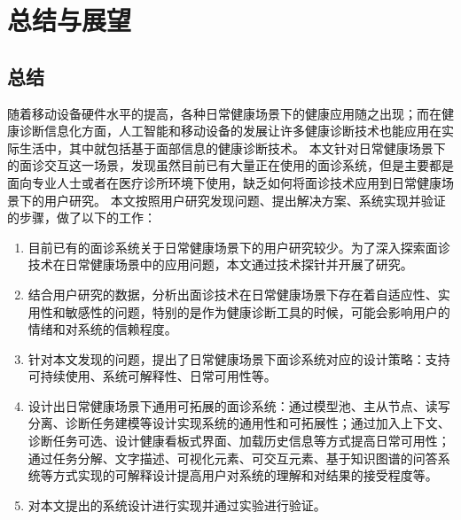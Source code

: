 \chapter{总结与展望}
\section{总结}
随着移动设备硬件水平的提高，各种日常健康场景下的健康应用随之出现；而在健康诊断信息化方面，人工智能和移动设备的发展让许多健康诊断技术也能应用在实际生活中，其中就包括基于面部信息的健康诊断技术。
本文针对日常健康场景下的面诊交互这一场景，发现虽然目前已有大量正在使用的面诊系统，但是主要都是面向专业人士或者在医疗诊所环境下使用，缺乏如何将面诊技术应用到日常健康场景下的用户研究。
本文按照用户研究发现问题、提出解决方案、系统实现并验证的步骤，做了以下的工作：
\begin{enumerate}
	\item 目前已有的面诊系统关于日常健康场景下的用户研究较少。为了深入探索面诊技术在日常健康场景中的应用问题，本文通过技术探针并开展了研究。
	
	\item 结合用户研究的数据，分析出面诊技术在日常健康场景下存在着自适应性、实用性和敏感性的问题，特别的是作为健康诊断工具的时候，可能会影响用户的情绪和对系统的信赖程度。
	
	\item 针对本文发现的问题，提出了日常健康场景下面诊系统对应的设计策略：支持可持续使用、系统可解释性、日常可用性等。

	\item 设计出日常健康场景下通用可拓展的面诊系统：通过模型池、主从节点、读写分离、诊断任务建模等设计实现系统的通用性和可拓展性；通过加入上下文、诊断任务可选、设计健康看板式界面、加载历史信息等方式提高日常可用性；通过任务分解、文字描述、可视化元素、可交互元素、基于知识图谱的问答系统等方式实现的可解释设计提高用户对系统的理解和对结果的接受程度等。

	\item 对本文提出的系统设计进行实现并通过实验进行验证。
\end{enumerate}




